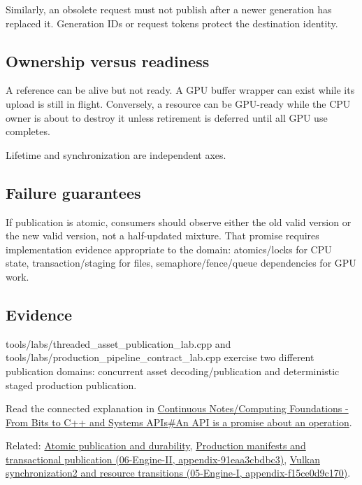 Similarly, an obsolete request must not publish after a newer generation has replaced it. Generation IDs or request tokens protect the destination identity.

\subsection{Ownership versus readiness}\label{ownership-versus-readiness}

A reference can be alive but not ready. A GPU buffer wrapper can exist while its upload is still in flight. Conversely, a resource can be GPU-ready while the CPU owner is about to destroy it unless retirement is deferred until all GPU use completes.

Lifetime and synchronization are independent axes.

\subsection{Failure guarantees}\label{failure-guarantees}

If publication is atomic, consumers should observe either the old valid version or the new valid version, not a half-updated mixture. That promise requires implementation evidence appropriate to the domain: atomics/locks for CPU state, transaction/staging for files, semaphore/fence/queue dependencies for GPU work.

\subsection{Evidence}\label{evidence}

tools/labs/threaded\_asset\_publication\_lab.cpp and tools/labs/production\_pipeline\_contract\_lab.cpp exercise two different publication domains: concurrent asset decoding/publication and deterministic staged production publication.

Read the connected explanation in \href{Continuous\%20Notes/Computing\%20Foundations\%20-\%20From\%20Bits\%20to\%20C++\%20and\%20Systems\%20APIs\#An\%20API\%20is\%20a\%20promise\%20about\%20an\%20operation}{Continuous Notes/Computing Foundations - From Bits to C++ and Systems APIs\#An API is a promise about an operation}.

Related: \hyperref[appendix-e89a8f290ef5]{Atomic publication and durability}, \href{}{Production manifests and transactional publication (06-Engine-II, appendix-91eaa3cbdbc3)}, \href{}{Vulkan synchronization2 and resource transitions (05-Engine-I, appendix-f15ce0d9c170)}.
